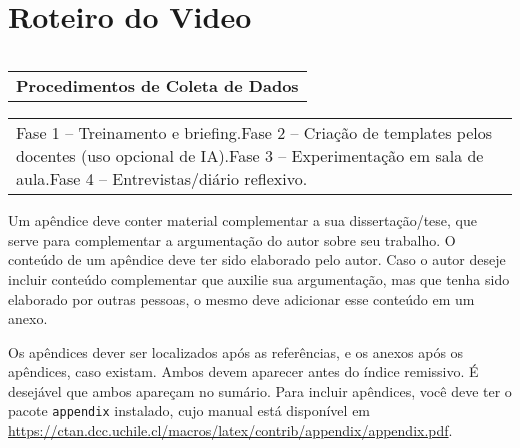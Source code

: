\chapter{Roteiro do Video}



\begin{table}
\centering

\begin{tabular}{l}
 \\

\end{tabular}

\end{table}

\begin{table}
\centering

\begin{tabular}{l}
\textbf{Procedimentos de Coleta de Dados} \\

\end{tabular}

\end{table}

\begin{table}
\centering

\begin{tabular}{l}
Fase 1 – Treinamento e briefing.Fase 2 – Criação de templates pelos docentes (uso opcional de IA).Fase 3 – Experimentação em sala de aula.Fase 4 – Entrevistas/diário reflexivo. \\

\end{tabular}

\end{table}

 


Um apêndice deve conter material complementar a sua dissertação/tese, que serve para complementar a argumentação do autor sobre seu trabalho. O conteúdo de um apêndice deve ter sido elaborado pelo autor. Caso o autor deseje incluir conteúdo complementar que auxilie sua argumentação, mas que tenha sido elaborado por outras pessoas, o mesmo deve adicionar esse conteúdo em um anexo.

Os apêndices dever ser localizados após as referências, e os anexos após os apêndices, caso existam. Ambos devem aparecer antes do índice remissivo. É desejável que ambos apareçam no sumário. Para incluir apêndices, você deve ter o pacote \texttt{appendix} \parencite{appendix} instalado, cujo manual está disponível em \url{https://ctan.dcc.uchile.cl/macros/latex/contrib/appendix/appendix.pdf}.


